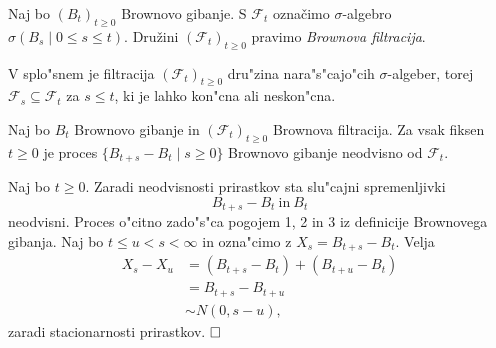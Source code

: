 \documentclass[twoside,11pt]{article}
\begin{document}
%



\begin{definicija}
    \begin{sloppypar}
    Naj bo $(B_t)_{t\geq 0}$ Brownovo gibanje. S $\mathcal{F}_t$ 
    označimo $\sigma$-algebro
    ${\sigma(B_s \mid 0\leq s \leq t)}$. Družini $(\mathcal{F}_t)_{t\geq 0}$ pravimo \textit{Brownova filtracija}.
    \end{sloppypar}
\end{definicija}

\begin{opomba}
    V splo"snem je filtracija $(\mathcal{F}_t)_{t\geq0}$ dru"zina nara"s"cajo"cih $\sigma$-algeber, torej $\mathcal{F}_s \subseteq \mathcal{F}_t$ za $s \leq t$, ki je lahko kon"cna ali neskon"cna.
\end{opomba}
 

\begin{izrek}
    Naj bo $B_t$ Brownovo gibanje in $(\mathcal{F}_t)_{t\geq 0}$ Brownova filtracija. Za vsak fiksen $t \geq 0$  je proces $\{B_{t+s}-B_t\mid s\geq 0\}$ Brownovo gibanje neodvisno od $\mathcal{F}_t$.
\end{izrek}

\begin{dokaz}
    Naj bo $t \geq 0$. Zaradi neodvisnosti prirastkov sta slu"cajni spremenljivki 
    $$
    B_{t+s}-B_t \ \text{in} \ B_t
    $$
    neodvisni. Proces o"citno zado"s"ca pogojem 1, 2 in 3 iz definicije Brownovega gibanja. Naj bo $t \leq u < s < \infty$ in ozna"cimo z $X_s = B_{t+s}-B_t$. Velja
    \begin{align*}
        X_s - X_u &= (B_{t + s} - B_t) + (B_{t + u} - B_t) \\        
                  &= B_{t + s} - B_{t + u} \\
                  &\sim N(0, s-u), 
    \end{align*}
    zaradi stacionarnosti prirastkov.
    $\hfill \square$
\end{dokaz}
\end{document}
